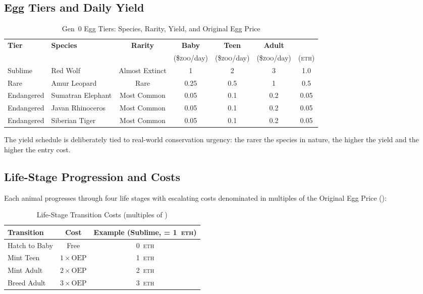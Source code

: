 \documentclass[11pt,letterpaper]{article}
\newcommand{\ZOO}{\$\textsc{zoo}}
\newcommand{\OEP}{\text{OEP}}
\newcommand{\ETH}{\textsc{eth}}
\begin{document}
\subsection{Egg Tiers and Daily Yield}

\begin{table}[ht]
\centering
\caption{Gen~0 Egg Tiers: Species, Rarity, Yield, and Original Egg Price}
\label{tab:egg-tiers}
\begin{tabular}{@{}llccccc@{}}
\toprule
\textbf{Tier} & \textbf{Species} & \textbf{Rarity} & \textbf{Baby} & \textbf{Teen} & \textbf{Adult} & \textbf{\OEP{}} \\
 & & & (\ZOO{}/day) & (\ZOO{}/day) & (\ZOO{}/day) & (\ETH{}) \\
\midrule
Sublime & Red Wolf & Almost Extinct & 1 & 2 & 3 & 1.0 \\
Rare & Amur Leopard & Rare & 0.25 & 0.5 & 1 & 0.5 \\
Endangered & Sumatran Elephant & Most Common & 0.05 & 0.1 & 0.2 & 0.05 \\
Endangered & Javan Rhinoceros & Most Common & 0.05 & 0.1 & 0.2 & 0.05 \\
Endangered & Siberian Tiger & Most Common & 0.05 & 0.1 & 0.2 & 0.05 \\
\bottomrule
\end{tabular}
\end{table}

The yield schedule is deliberately tied to real-world conservation urgency: the rarer the species in nature, the higher the yield and the higher the entry cost.

\subsection{Life-Stage Progression and Costs}

Each animal progresses through four life stages with escalating costs denominated in multiples of the Original Egg Price (\OEP{}):

\begin{table}[ht]
\centering
\caption{Life-Stage Transition Costs (multiples of \OEP{})}
\label{tab:life-stages}
\begin{tabular}{@{}lcc@{}}
\toprule
\textbf{Transition} & \textbf{Cost} & \textbf{Example (Sublime, \OEP{} = 1~\ETH{})} \\
\midrule
Hatch to Baby & Free & 0~\ETH{} \\
Mint Teen & $1 \times \OEP$ & 1~\ETH{} \\
Mint Adult & $2 \times \OEP$ & 2~\ETH{} \\
Breed Adult & $3 \times \OEP$ & 3~\ETH{} \\
\bottomrule
\end{tabular}
\end{table}
\end{document}
